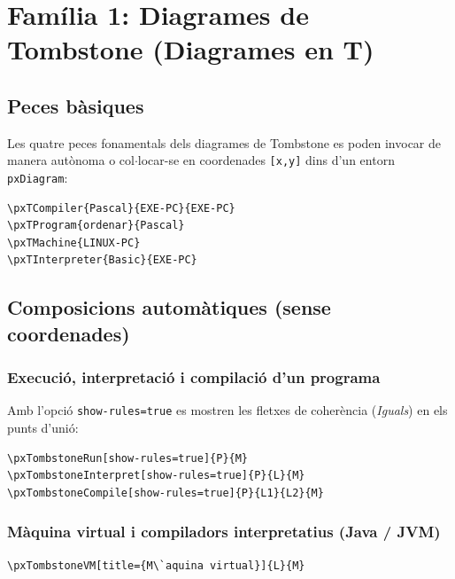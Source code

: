 \documentclass[11pt,a4paper]{article}
\begin{document}
\newpage
\section{Fam\'ilia 1: Diagrames de Tombstone (Diagrames en T)}

\subsection{Peces b\`asiques}
Les quatre peces fonamentals dels diagrames de Tombstone es poden invocar de manera
aut\`onoma o col$\cdot$locar-se en coordenades \texttt{[x,y]} dins d'un entorn \texttt{pxDiagram}:

\begin{verbatim}
\pxTCompiler{Pascal}{EXE-PC}{EXE-PC}
\pxTProgram{ordenar}{Pascal}
\pxTMachine{LINUX-PC}
\pxTInterpreter{Basic}{EXE-PC}
\end{verbatim}

\quad
{}\quad
{}\quad
{}

\subsection{Composicions autom\`atiques (sense coordenades)}

\subsubsection*{Execuci\'o, interpretaci\'o i compilaci\'o d'un programa}
Amb l'opci\'o \texttt{show-rules=true} es mostren les fletxes de coher\`encia (\emph{Iguals})
en els punts d'uni\'o:

\begin{verbatim}
\pxTombstoneRun[show-rules=true]{P}{M}
\pxTombstoneInterpret[show-rules=true]{P}{L}{M}
\pxTombstoneCompile[show-rules=true]{P}{L1}{L2}{M}
\end{verbatim}


\subsubsection*{M\`aquina virtual i compiladors interpretatius (Java / JVM)}
\begin{verbatim}
\pxTombstoneVM[title={M\`aquina virtual}]{L}{M}
\end{verbatim}
\end{document}
